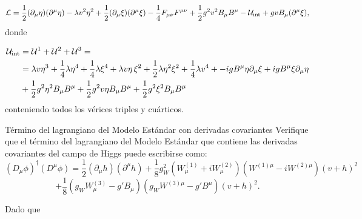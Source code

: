 \begin{equation} \small
\mathcal{L} =
\frac{1}{2}(\partial_\mu \eta)(\partial^\mu \eta)
- \lambda v^2 \eta^2
+ \frac{1}{2}(\partial_\mu \xi)(\partial^\mu \xi)
- \frac{1}{4}F_{\mu\nu}F^{\mu\nu}
+ \frac{1}{2}g^2 v^2 B_\mu B^\mu
- \mathcal{U}_{\text{int}}
+ g v B_\mu (\partial^\mu \xi),
\end{equation}
donde 

\begin{align} 
	\mathcal{U}_{\text{int}} & = \mathcal{U}^1 + \mathcal{U}^2 + \mathcal{U}^3 =  \nonumber \\
	& =  \lambda v\eta^3 + \frac{1}{4}\lambda\eta^4
	+ \frac{1}{4}\lambda\xi^4 + \lambda v\eta\,\xi^2 + \frac{1}{2}\lambda \eta^2\xi^2 + \frac{1}{4}\lambda v^4 + - i g  B^\mu \eta \partial_\mu \xi + i g B^\mu \xi \partial_\mu \eta  \nonumber \\ 
	& + \frac{1}{2}g^2  \eta^2 B_\mu B^\mu +
		\frac{1}{2}g^2 v \eta  B_\mu B^\mu +
		\frac{1}{2}g^2  \xi^2 B_\mu B^\mu    
\end{align}
conteniendo todos los vérices triples y cuárticos. 



\begin{Ejercicio}{Término del lagrangiano del Modelo Estándar con derivadas covariantes}\label{Ej:14}
Verifique que el término del lagrangiano del Modelo Estándar que contiene las derivadas covariantes del campo de Higgs puede escribirse como:
\[
(D_\mu \phi)^\dagger (D^\mu \phi)
= \frac{1}{2}(\partial_\mu h)(\partial^\mu h)
+ \frac{1}{8} g_W^2 (W_\mu^{(1)} + iW_\mu^{(2)})(W^{(1)\mu} - iW^{(2)\mu})(v+h)^2
\]
\[
+ \frac{1}{8}(g_W W_\mu^{(3)} - g' B_\mu)(g_W W^{(3)\mu} - g' B^\mu)(v+h)^2.
\]
\end{Ejercicio}

Dado que 

